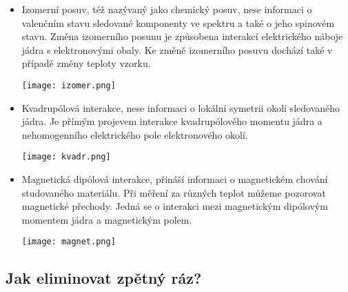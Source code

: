 \documentclass[../../main.tex]{subfiles}
\begin{document}
\begin{itemize}
\item Izomerní posuv, též nazývaný jako chemický posuv, nese informaci o valenčním
stavu sledované komponenty ve spektru a také o jeho spinovém stavu. Změna izomerního posunu je způsobena interakcí elektrického náboje jádra s elektronovými obaly. Ke změně izomerního posuvu dochází také v případě změny teploty vzorku.

\begin{center}
	\texttt{[image: izomer.png]}
\end{center}

\item Kvadrupólová interakce, nese informaci o lokální symetrii okolí sledovaného jádra. Je přímým projevem interakce kvadrupólového momentu jádra a nehomogenního elektrického pole elektronového okolí.

\begin{center}
	\texttt{[image: kvadr.png]}
\end{center}

\item Magnetická dipólová interakce, přináší informaci o magnetickém chování studovaného materiálu. Při měření za různých teplot můžeme pozorovat magnetické přechody. Jedná se o interakci mezi magnetickým dipólovým momentem jádra a magnetickým polem.

\begin{center}
	\texttt{[image: magnet.png]}
\end{center}

\end{itemize}

\subsection{Jak eliminovat zpětný ráz?}
\end{document}
